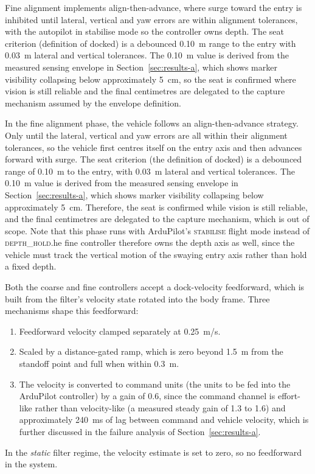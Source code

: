 Fine alignment implements align-then-advance, where surge toward the entry is inhibited until lateral, vertical and yaw errors are within alignment tolerances, with the autopilot in stabilise mode so the controller owns depth. The seat criterion (definition of docked) is a debounced 0.10~m range to the entry with 0.03~m lateral and vertical tolerances. The 0.10~m value is derived from the measured sensing envelope in Section~\ref{sec:results-a}, which shows marker visibility collapsing below approximately 5~cm, so the seat is confirmed where vision is still reliable and the final centimetres are delegated to the capture mechanism assumed by the envelope definition.

In the fine alignment phase, the vehicle follows an align-then-advance strategy.
Only until the lateral, vertical and yaw errors are all within their alignment tolerances, so the vehicle first centres itself on the entry axis and then advances forward with surge. The seat criterion (the definition of docked) is a debounced range of 0.10~m to the entry, with 0.03~m lateral and vertical tolerances. The 0.10~m value is derived from the measured sensing envelope in Section~\ref{sec:results-a}, which shows marker visibility collapsing below approximately 5~cm. Therefore, the seat is confirmed while vision is still reliable, and the final centimetres are delegated to the capture mechanism, which is out of scope. Note that this phase runs with ArduPilot's \textsc{stabilise} flight mode instead of \textsc{depth\_hold}.he fine controller therefore owns the depth axis as well, since the vehicle must track the vertical motion of the swaying entry axis rather than hold a fixed depth.

Both the coarse and fine controllers accept a dock-velocity feedforward, which is built from the filter's velocity state rotated into the body frame. Three mechanisms shape this feedforward:
\begin{enumerate}
    \item Feedforward velocity clamped separately at 0.25~m/s.
    \item Scaled by a distance-gated ramp, which is zero beyond 1.5~m from the standoff point and full when within 0.3~m.
    \item The velocity is converted to command units (the units to be fed into the ArduPilot controller) by a gain of 0.6, since the command channel is effort-like rather than velocity-like (a measured steady gain of 1.3 to 1.6) and approximately 240~ms of lag between command and vehicle velocity, which is further discussed in the failure analysis of Section~\ref{sec:results-a}.
\end{enumerate}
\noindent In the \emph{static} filter regime, the velocity estimate is set to zero, so no feedforward in the system.

